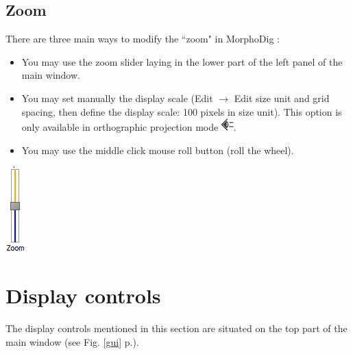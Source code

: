 \subsection{Zoom}
There are three main ways to modify the ``zoom" in MorphoDig :


\begin{minipage}{0.7\textwidth}
\begin{itemize}
\item You may use the zoom slider laying in the lower part of the left panel of the main window.
\item	You may set manually the display scale (Edit $\rightarrow$  Edit size unit and grid spacing, then define the display scale: 100 pixels in size unit). This option is only available in orthographic projection mode \includegraphics[scale=0.7]{images/06/camera/camera_ortho.png}.
\item	You may use the middle click mouse roll button (roll the wheel).
\end{itemize}
\end{minipage}    
\begin{minipage}{0.25\textwidth}\centering
  \includegraphics[scale=0.5]{images/06/camera/zoom_slider.png}


 \end{minipage}    


\section{Display controls}
The display controls mentioned in this section are situated on the top part of the main window (see Fig. \ref{gui} p.\pageref{gui}).


